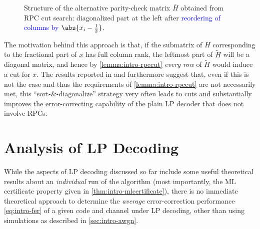 \begin{figure}
  \centering
  \caption{Structure of the alternative parity-check matrix $\bar H$ obtained from RPC cut search: \textcolor{Lime!20!Black}{diagonalized part} at the left after \textcolor{Blue}{reordering of columns by $\abs{x_i-\frac 12}$}.}
  \label{fig:rpc-matrix}
\end{figure}
The motivation behind this approach is that, if the submatrix of $H$ corresponding to the fractional part of $x$ has full column rank, the leftmost part of $\tilde H$ will be a diagonal matrix, and hence by \cref{lemma:intro-rpccut} \emph{every row} of $\tilde H$ would induce a cut for $x$. The results reported in \cite{Tanatmis+10SeparationAlgorithm} and \cite{ZhangSiegel11AdaptiveCut} furthermore suggest that, even if this is not the case and thus the requirements of \cref{lemma:intro-rpccut} are not necessarily met, this \enquote{sort-\&-diagonalize} strategy very often leads to cuts and substantially improves the error-correcting capability of the plain LP decoder that does not involve RPCs.

\section{Analysis of LP Decoding}
\label{sec:intro-lp-analysis}
While the aspects of LP decoding discussed so far include some useful theoretical results about an \emph{individual} run of the algorithm (most importantly, the ML certificate property given in \cref{thm:intro-mlcertificate}), there is no immediate theoretical approach to determine the \emph{average} error-correction performance \cref{eq:intro-fer} of a given code and channel under LP decoding, other than using simulations as described in \cref{sec:intro-awgn}.

